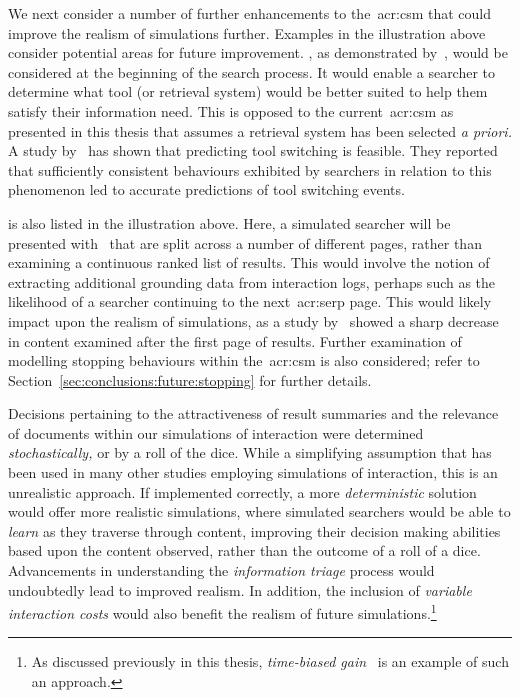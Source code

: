 We next consider a number of further enhancements to the~\gls{acr:csm} that could improve the realism of simulations further. Examples in the illustration above consider potential areas for future improvement. , as demonstrated by~\cite{thomas2014modelling_behaviour}, would be considered at the beginning of the search process. It would enable a searcher to determine what tool (or retrieval system) would be better suited to help them satisfy their information need. This is opposed to the current~\gls{acr:csm} as presented in this thesis that assumes a retrieval system has been selected \emph{a priori.} A study by~\cite{white2009tool_switching} has shown that predicting tool switching is feasible. They reported that sufficiently consistent behaviours exhibited by searchers in relation to this phenomenon led to accurate predictions of tool switching events.

 is also listed in the illustration above. Here, a simulated searcher will be presented with~ that are split across a number of different pages, rather than examining a continuous ranked list of results. This would involve the notion of extracting additional grounding data from interaction logs, perhaps such as the likelihood of a searcher continuing to the next~\gls{acr:serp} page. This would likely impact upon the realism of simulations, as a study by~\cite{jansen2005analysis} showed a sharp decrease in content examined after the first page of results. Further examination of modelling stopping behaviours within the~\gls{acr:csm} is also considered; refer to Section~\ref{sec:conclusions:future:stopping} for further details.

 Decisions pertaining to the attractiveness of result summaries and the relevance of documents within our simulations of interaction were determined \emph{stochastically,} or by a roll of the dice. While a simplifying assumption that has been used in many other studies employing simulations of interaction, this is an unrealistic approach. If implemented correctly, a more \emph{deterministic} solution would offer more realistic simulations, where simulated searchers would be able to \emph{learn} as they traverse through content, improving their decision making abilities based upon the content observed, rather than the outcome of a roll of a dice. Advancements in understanding the \emph{information triage} process would undoubtedly lead to improved realism. In addition, the inclusion of \emph{variable interaction costs} would also benefit the realism of future simulations.\footnote{As discussed previously in this thesis, \emph{time-biased gain}~\citep{smucker2012tbg} is an example of such an approach.}

